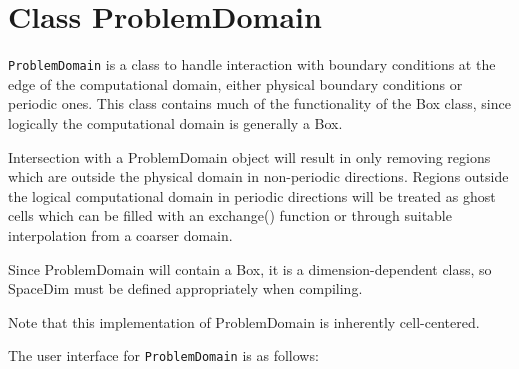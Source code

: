 
\section{Class ProblemDomain}

{\tt ProblemDomain} is a class to handle interaction with boundary
conditions at the edge of the computational domain, either physical
boundary conditions or periodic ones. This class contains much of the
functionality of the Box class, since logically the computational
domain is generally a Box.   
  
Intersection with a ProblemDomain object will result in only removing
regions which are outside the physical domain in non-periodic 
directions. Regions outside the logical computational domain in
periodic directions will be treated as ghost cells which can be filled
with an exchange() function or through suitable interpolation from a
coarser domain. 

Since ProblemDomain will contain a Box, it is a dimension-dependent
class, so SpaceDim must be defined appropriately when compiling.   

Note that this implementation of ProblemDomain is inherently
cell-centered. 

The user interface for {\tt ProblemDomain} is as follows:

